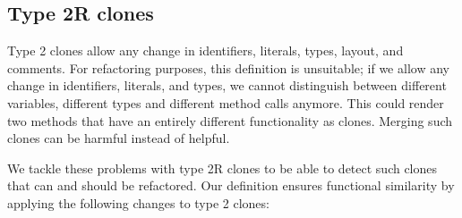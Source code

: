 \documentclass[a4paper]{article}
\begin{document}
\subsection{Type 2R clones}
Type 2 clones allow any change in identifiers, literals, types, layout, and comments. For refactoring purposes, this definition is unsuitable; if we allow any change in identifiers, literals, and types, we cannot distinguish between different variables, different types and different method calls anymore. This could render two methods that have an entirely different functionality as clones. Merging such clones can be harmful instead of helpful.

We tackle these problems with type 2R clones to be able to detect such clones that can and should be refactored. Our definition ensures functional similarity by applying the following changes to type 2 clones:
\end{document}
